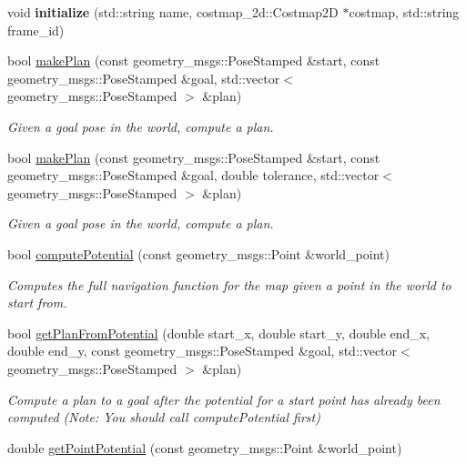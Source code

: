 \begin{DoxyCompactItemize}
void {\bfseries initialize} (std\+::string name, costmap\+\_\+2d\+::\+Costmap2D $\ast$costmap, std\+::string frame\+\_\+id)
\item 
bool \mbox{\hyperlink{classglobal__planner_1_1_global_planner_abb7f40f6a851f88e6b7668a38571712a}{make\+Plan}} (const geometry\+\_\+msgs\+::\+Pose\+Stamped \&start, const geometry\+\_\+msgs\+::\+Pose\+Stamped \&goal, std\+::vector$<$ geometry\+\_\+msgs\+::\+Pose\+Stamped $>$ \&plan)
\begin{DoxyCompactList}\small\item\em Given a goal pose in the world, compute a plan. \end{DoxyCompactList}\item 
bool \mbox{\hyperlink{classglobal__planner_1_1_global_planner_a4f6bfa5acf58670c01a5b8c684a2f20c}{make\+Plan}} (const geometry\+\_\+msgs\+::\+Pose\+Stamped \&start, const geometry\+\_\+msgs\+::\+Pose\+Stamped \&goal, double tolerance, std\+::vector$<$ geometry\+\_\+msgs\+::\+Pose\+Stamped $>$ \&plan)
\begin{DoxyCompactList}\small\item\em Given a goal pose in the world, compute a plan. \end{DoxyCompactList}\item 
bool \mbox{\hyperlink{classglobal__planner_1_1_global_planner_aa64e1114c4a78980256bd04bd0e79efa}{compute\+Potential}} (const geometry\+\_\+msgs\+::\+Point \&world\+\_\+point)
\begin{DoxyCompactList}\small\item\em Computes the full navigation function for the map given a point in the world to start from. \end{DoxyCompactList}\item 
bool \mbox{\hyperlink{classglobal__planner_1_1_global_planner_a4bae9ef237ecc53aa3027abd3dc063b5}{get\+Plan\+From\+Potential}} (double start\+\_\+x, double start\+\_\+y, double end\+\_\+x, double end\+\_\+y, const geometry\+\_\+msgs\+::\+Pose\+Stamped \&goal, std\+::vector$<$ geometry\+\_\+msgs\+::\+Pose\+Stamped $>$ \&plan)
\begin{DoxyCompactList}\small\item\em Compute a plan to a goal after the potential for a start point has already been computed (Note\+: You should call compute\+Potential first) \end{DoxyCompactList}\item 
double \mbox{\hyperlink{classglobal__planner_1_1_global_planner_a7f0a8eaf0e715f682480ef447a63cd67}{get\+Point\+Potential}} (const geometry\+\_\+msgs\+::\+Point \&world\+\_\+point)

\end{DoxyCompactItemize}
